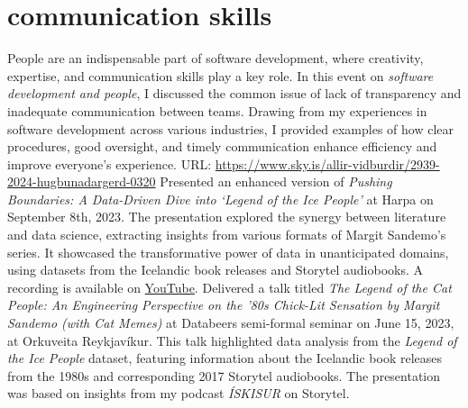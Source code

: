 \section{communication skills}
\begin{entrylist}
{People are an indispensable part of software development, where creativity, expertise, and
communication skills play a key role. In this event on \emph{software development and people}, I
discussed the common issue of lack of transparency and inadequate communication between teams.
Drawing from my experiences in software development across various industries, I provided
examples of how clear procedures, good oversight, and timely communication enhance efficiency and
improve everyone's experience.
URL: \url{https://www.sky.is/allir-vidburdir/2939-2024-hugbunadargerd-0320}}
{Presented an enhanced version of \emph{Pushing Boundaries: A Data-Driven Dive into
`Legend of the Ice People'} at Harpa on September 8th, 2023.
The presentation explored the synergy between literature and data science, extracting insights
from various formats of Margit Sandemo's series. It showcased the transformative power of data in
unanticipated domains, using datasets from the Icelandic book releases and Storytel audiobooks.
A recording is available on \href{https://www.youtube.com/watch?v=vyHsq-1FUHY}{YouTube}.}
{Delivered a talk titled \emph{The Legend of the Cat People: An Engineering Perspective on the
'80s Chick-Lit Sensation by Margit Sandemo (with Cat Memes)} at Databeers semi-formal seminar on
June 15, 2023, at Orkuveita Reykjavíkur. This talk highlighted data analysis from the
\emph{Legend of the Ice People} dataset, featuring information about the Icelandic book releases
from the 1980s and corresponding 2017 Storytel audiobooks. The presentation was based on insights
from my podcast \emph{ÍSKISUR} on Storytel.
}
\end{entrylist}
